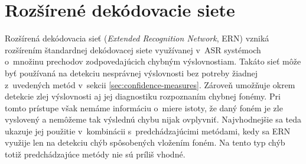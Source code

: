 



\section{Rozšírené dekódovacie siete}

Rozšírená dekódovacia sieť (\textit{Extended Recognition Network}, ERN) vzniká rozšírením štandardnej dekódovacej siete využívanej v~ASR systémoch o~množinu prechodov zodpovedajúcich chybným výslovnostiam. Takáto sieť môže byť používaná na detekciu nesprávnej výslovnosti bez potreby žiadnej z~uvedených metód v~sekcii \ref{sec:confidence-measures}\cite{Harrison2009, Lo2010}. Zároveň umožňuje okrem detekcie zlej výslovnosti aj jej diagnostiku rozpoznaním chybnej fonémy.  Pri tomto prístupe však nemáme informáciu o~miere istoty, že daný foném je zle vyslovený a nemôžeme tak výslednú chybu nijak ovplyvniť. Najvhodnejšie sa teda ukazuje jej použitie v~kombinácii s~predchádzajúcimi metódami, kedy sa ERN využije len na detekciu chýb spôsobených vložením foném. Na tento typ chýb totiž predchádzajúce metódy nie sú príliš vhodné.



